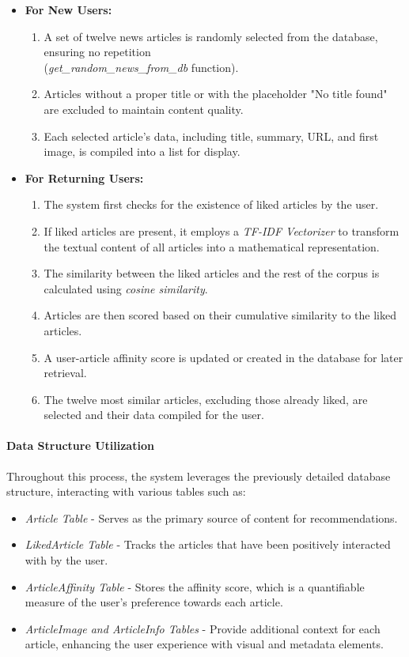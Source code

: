 \documentclass[10pt]{article}
\begin{document}
\begin{itemize}
    \item \textbf{For New Users:}
    \begin{enumerate}
        \item A set of twelve news articles is randomly selected from the database, ensuring no repetition \\(\textit{get\_random\_news\_from\_db} function).
        \item Articles without a proper title or with the placeholder "No title found" are excluded to maintain content quality.
        \item Each selected article's data, including title, summary, URL, and first image, is compiled into a list for display.
    \end{enumerate}
    
    \item \textbf{For Returning Users:}
    \begin{enumerate}
        \item The system first checks for the existence of liked articles by the user.
        \item If liked articles are present, it employs a \textit{TF-IDF Vectorizer} to transform the textual content of all articles into a mathematical representation.
        \item The similarity between the liked articles and the rest of the corpus is calculated using \textit{cosine similarity}.
        \item Articles are then scored based on their cumulative similarity to the liked articles.
        \item A user-article affinity score is updated or created in the database for later retrieval.
        \item The twelve most similar articles, excluding those already liked, are selected and their data compiled for the user.
    \end{enumerate}
\end{itemize}

\paragraph{Data Structure Utilization}
Throughout this process, the system leverages the previously detailed database structure, interacting with various tables such as:

\begin{itemize}
    \item \textit{Article Table} - Serves as the primary source of content for recommendations.
    \item \textit{LikedArticle Table} - Tracks the articles that have been positively interacted with by the user.
    \item \textit{ArticleAffinity Table} - Stores the affinity score, which is a quantifiable measure of the user's preference towards each article.
    \item \textit{ArticleImage and ArticleInfo Tables} - Provide additional context for each article, enhancing the user experience with visual and metadata elements.
\end{itemize}
\end{document}
